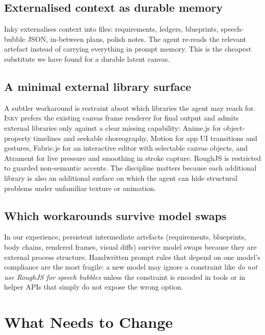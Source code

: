 \documentclass[10pt,twocolumn]{article}
\newcommand{\inky}{\textsc{Inky}}
\begin{document}
\subsection{Externalised context as durable memory}

Inky externalises context into files: requirements, ledgers,
blueprints, speech-bubble JSON, in-between plans, polish notes. The
agent re-reads the relevant artefact instead of carrying everything
in prompt memory. This is the cheapest substitute we have found for a
durable latent canvas.

\subsection{A minimal external library surface}

A subtler workaround is restraint about which libraries the agent
may reach for. \inky{} prefers the existing canvas frame renderer
for final output and admits external libraries only against a clear
missing capability: Anime.js for object-property timelines and
seekable choreography, Motion for app UI transitions and gestures,
Fabric.js for an interactive editor with selectable canvas objects,
and Atrament for live pressure and smoothing in stroke capture.
RoughJS is restricted to guarded non-semantic accents. The
discipline matters because each additional library is also an
additional surface on which the agent can hide structural problems
under unfamiliar texture or animation.

\subsection{Which workarounds survive model swaps}

In our experience, persistent intermediate artefacts (requirements,
blueprints, body chains, rendered frames, visual diffs) survive model
swaps because they are external process structure. Handwritten prompt
rules that depend on one model's compliance are the most fragile: a
new model may ignore a constraint like \emph{do not use RoughJS for
speech bubbles} unless the constraint is encoded in tools or in
helper APIs that simply do not expose the wrong option.

\section{What Needs to Change}
\end{document}
